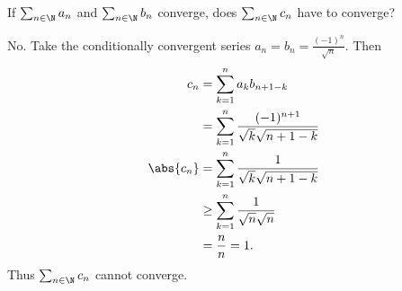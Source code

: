 
If $\sum_{n \in \N} a_n$ and $\sum_{n \in \N} b_n$ converge, does
$\sum_{n \in \N} c_n$ have to converge?

No.
Take the conditionally convergent series $a_n = b_n = \frac{(-1)^n}{\sqrt n}$.
Then \begin{align*}
    c_n   &= \sum_{k=1}^n a_k b_{n+1-k} \\
         &= \sum_{k=1}^n \frac{(-1)^{n+1}}{\sqrt k \sqrt{n+1-k}} \\
    \abs{c_n} &= \sum_{k=1}^n \frac{1}{\sqrt k \sqrt{n+1-k}} \\
         &\ge \sum_{k=1}^n \frac{1}{\sqrt n \sqrt n} \\
         &= \frac{n}{n} = 1.
\end{align*}
Thus $\sum_{n \in \N} c_n$ cannot converge.

